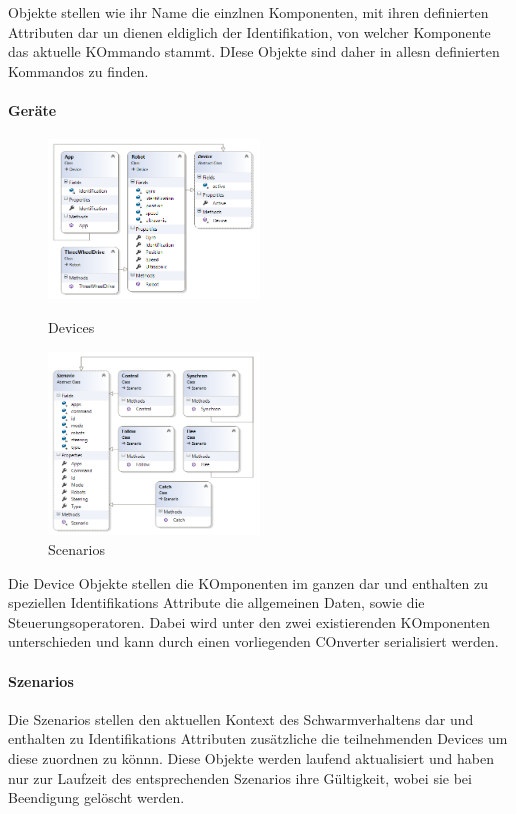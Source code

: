 Objekte stellen wie ihr Name die einzlnen Komponenten, mit ihren definierten Attributen dar un dienen eldiglich der Identifikation, von welcher Komponente das aktuelle KOmmando stammt. DIese Objekte sind daher in allesn definierten Kommandos zu finden.

\newpage
\paragraph{Geräte}

\begin{figure}
	\begin{center}
		\includegraphics[width=0.5\textwidth]{images/uml/devices.png}
	\end{center}
	\caption{Devices}
	\label{fig:devices_classdiagram}
	\begin{center}
		\includegraphics[width=0.5\textwidth]{images/uml/szenarios.png}
	\end{center}
	\caption{Scenarios}
	\label{fig:szenarios_classdiagram}
\end{figure}

Die Device Objekte stellen die KOmponenten im ganzen dar und enthalten zu speziellen Identifikations Attribute die allgemeinen Daten, sowie die Steuerungsoperatoren. Dabei wird unter den zwei existierenden KOmponenten unterschieden und kann durch einen vorliegenden COnverter serialisiert werden.

\paragraph{Szenarios}
Die Szenarios stellen den aktuellen Kontext des Schwarmverhaltens dar und enthalten zu Identifikations Attributen zusätzliche die teilnehmenden Devices um diese zuordnen zu könnn. Diese Objekte werden laufend aktualisiert und haben nur zur Laufzeit des entsprechenden Szenarios ihre Gültigkeit, wobei sie bei Beendigung gelöscht werden.

